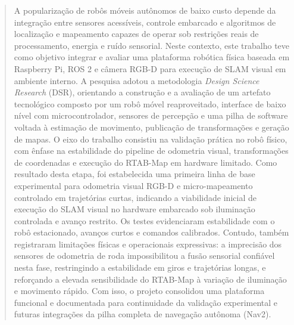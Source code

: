 %
%

\begin{abstract}
A popularização de robôs móveis autônomos de baixo custo depende da integração entre sensores acessíveis, controle embarcado e algoritmos de localização e mapeamento capazes de operar sob restrições reais de processamento, energia e ruído sensorial. Neste contexto, este trabalho teve como objetivo integrar e avaliar uma plataforma robótica física baseada em Raspberry Pi, ROS 2 e câmera RGB-D para execução de SLAM visual em ambiente interno. A pesquisa adotou a metodologia \emph{Design Science Research} (DSR), orientando a construção e a avaliação de um artefato tecnológico composto por um robô móvel reaproveitado, interface de baixo nível com microcontrolador, sensores de percepção e uma pilha de software voltada à estimação de movimento, publicação de transformações e geração de mapas. O eixo do trabalho consistiu na validação prática no robô físico, com ênfase na estabilidade do pipeline de odometria visual, transformações de coordenadas e execução do RTAB-Map em hardware limitado. Como resultado desta etapa, foi estabelecida uma primeira linha de base experimental para odometria visual RGB-D e micro-mapeamento controlado em trajetórias curtas, indicando a viabilidade inicial de execução do SLAM visual no hardware embarcado sob iluminação controlada e avanço restrito. Os testes evidenciaram estabilidade com o robô estacionado, avanços curtos e comandos calibrados. Contudo, também registraram limitações físicas e operacionais expressivas: a imprecisão dos sensores de odometria de roda impossibilitou a fusão sensorial confiável nesta fase, restringindo a estabilidade em giros e trajetórias longas, e reforçando a elevada sensibilidade do RTAB-Map à variação de iluminação e movimento rápido. Com isso, o projeto consolidou uma plataforma funcional e documentada para continuidade da validação experimental e futuras integrações da pilha completa de navegação autônoma (Nav2).
\end{abstract}

%
%

